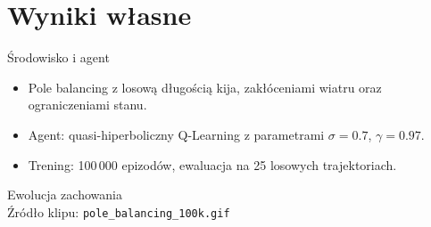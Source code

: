 \section{Wyniki własne}



\begin{frame}{Środowisko i agent}
  \begin{itemize}
    \item Pole balancing z losową długością kija, zakłóceniami wiatru oraz ograniczeniami stanu.
    \item Agent: quasi-hiperboliczny Q-Learning z parametrami $\sigma=0.7$, $\gamma=0.97$.
    \item Trening: 100\,000 epizodów, ewaluacja na 25 losowych trajektoriach.
  \end{itemize}
\end{frame}

\begin{frame}{Ewolucja zachowania}
  \centering
  \\
  \vspace{0.5em}
  \small Źródło klipu: \texttt{pole\_balancing\_100k.gif}
\end{frame}

